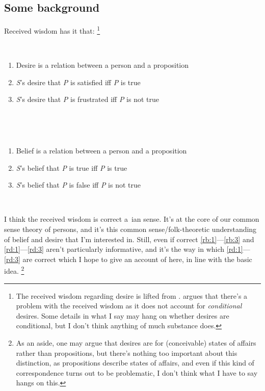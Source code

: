 \documentclass[10pt]{article}
\begin{document}
\subsection{Some background}
\label{sec:some-background}

Received wisdom has it that:\nolinebreak
\footnote{The received wisdom regarding desire is lifted from \textcite{McDaniel:2008aa}.
  \citeauthor{McDaniel:2008aa} argues that there's a problem with the received wisdom as it does not account for \emph{conditional} desires.
Some details in what I say may hang on whether desires are conditional, but I don't think anything of much substance does.}

\begin{minipage}{0.45\linewidth}\mbox{ }
  \begin{enumerate}[labelindent=\parindent,leftmargin=*,label=(RB\arabic*)]
  \item\label{rd:1} Desire is a relation between a person and a proposition
  \item\label{rd:2} \emph{S}’s desire that \emph{P} is satisfied iff \emph{P} is true
  \item\label{rd:3} \emph{S}’s desire that \emph{P} is frustrated iff \emph{P} is not true
  \end{enumerate}\mbox{ }
\end{minipage}\hfill
\begin{minipage}{0.45\linewidth}\mbox{ }
  \begin{enumerate}[labelindent=\parindent,leftmargin=*,label=(RD\arabic*)]
  \item\label{rb:1} Belief is a relation between a person and a proposition
  \item\label{rb:2} \emph{S}’s belief that \emph{P} is true iff \emph{P} is true
  \item\label{rb:3} \emph{S}’s belief that \emph{P} is false iff \emph{P} is not true
  \end{enumerate}\mbox{ }
\end{minipage}

I think the received wisdom is correct a~\citeauthor{Lewis:1974aa}ian sense.
It's at the core of our common sense theory of persons, and it's this common sense/folk-theoretic understanding of belief and desire that I'm interested in.
Still, even if correct \ref{rb:1}---\ref{rb:3} and \ref{rd:1}---\ref{rd:3} aren't particularly informative, and it's the way in which \ref{rd:1}---\ref{rd:3} are correct which I hope to give an account of here, in line with the basic idea.\nolinebreak
\footnote{As an aside, one may argue that desires are for (conceivable) states of affairs rather than propositions, but there's nothing too important about this distinction, as propositions describe states of affairs, and even if this kind of correspondence turns out to be problematic, I don't think what I have to say hangs on this.}
\end{document}
